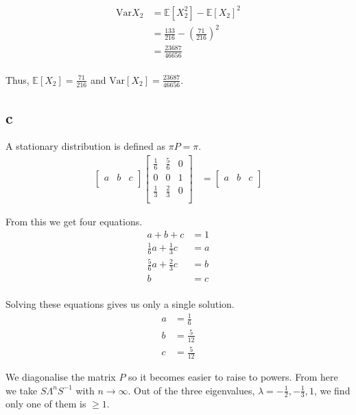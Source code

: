 \documentclass{article}
\newcommand{\expect}{\mathbb{E}}
\newcommand{\var}{\text{Var}}
\begin{document}
\begin{align*}
    \var X_2 &= \expect[X_2^2] - \expect{[X_2]}^2 \\
             &= \frac{133}{216} - {(\frac{71}{216})}^2 \\
             &= \frac{23687}{46656} \\
\end{align*}

Thus, $\expect[X_2] = \frac{71}{216}$ and $\var[X_2] = \frac{23687}{46656}$.

\subsection{c}
A stationary distribution is defined as $\pi P = \pi$.
\begin{align*}
    \begin{bmatrix}
        a & b & c \\
    \end{bmatrix}
    \begin{bmatrix}
        \frac{1}{6} & \frac{5}{6} & 0 \\
                  0 &           0 & 1 \\
        \frac{1}{3} & \frac{2}{3} & 0 \\
    \end{bmatrix}
    &=
    \begin{bmatrix}
        a & b & c \\
    \end{bmatrix}
\end{align*}

From this we get four equations.
\begin{align*}
    a + b + c &= 1 \\
    \frac{1}{6} a + \frac{1}{3} c &= a \\
    \frac{5}{6} a + \frac{2}{3} c &= b \\
    b &= c \\
\end{align*}

Solving these equations gives us only a single solution.
\begin{align*}
    a &= \frac{1}{6} \\
    b &= \frac{5}{12} \\
    c &= \frac{5}{12}
\end{align*}

We diagonalise the matrix $P$ so it becomes easier to raise to powers.
From here we take $S \Lambda^n S^{-1}$ with $n \to \infty$. Out of the three
eigenvalues, $\lambda = -\frac{1}{2}, -\frac{1}{3}, 1$,
we find only one of them is $\geq 1$.
\end{document}
